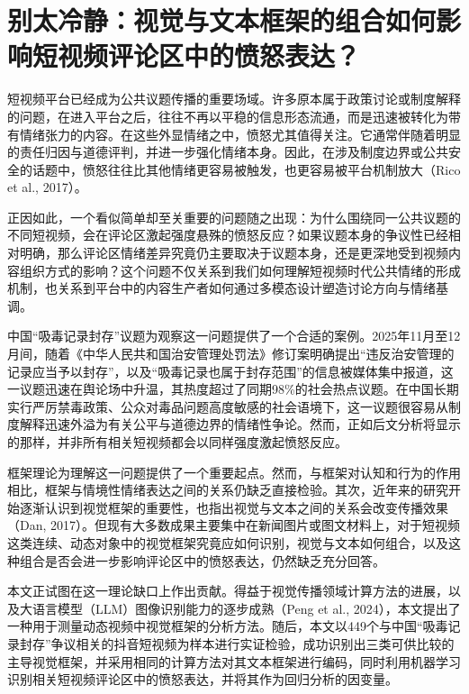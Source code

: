 \documentclass[
]{article}
\author{}
\date{}
\begin{document}
\section{别太冷静：视觉与文本框架的组合如何影响短视频评论区中的愤怒表达？}\label{ux522bux592aux51b7ux9759ux89c6ux89c9ux4e0eux6587ux672cux6846ux67b6ux7684ux7ec4ux5408ux5982ux4f55ux5f71ux54cdux77edux89c6ux9891ux8bc4ux8bbaux533aux4e2dux7684ux6124ux6012ux8868ux8fbe}

短视频平台已经成为公共议题传播的重要场域。许多原本属于政策讨论或制度解释的问题，在进入平台之后，往往不再以平稳的信息形态流通，而是迅速被转化为带有情绪张力的内容。在这些外显情绪之中，愤怒尤其值得关注。它通常伴随着明显的责任归因与道德评判，并进一步强化情绪本身。因此，在涉及制度边界或公共安全的话题中，愤怒往往比其他情绪更容易被触发，也更容易被平台机制放大（Rico
et al., 2017）。

正因如此，一个看似简单却至关重要的问题随之出现：为什么围绕同一公共议题的不同短视频，会在评论区激起强度悬殊的愤怒反应？如果议题本身的争议性已经相对明确，那么评论区情绪差异究竟仍主要取决于议题本身，还是更深地受到视频内容组织方式的影响？这个问题不仅关系到我们如何理解短视频时代公共情绪的形成机制，也关系到平台中的内容生产者如何通过多模态设计塑造讨论方向与情绪基调。

中国``吸毒记录封存''议题为观察这一问题提供了一个合适的案例。2025年11月至12月间，随着《中华人民共和国治安管理处罚法》修订案明确提出``违反治安管理的记录应当予以封存''，以及``吸毒记录也属于封存范围''的信息被媒体集中报道，这一议题迅速在舆论场中升温，其热度超过了同期98\%的社会热点议题。在中国长期实行严厉禁毒政策、公众对毒品问题高度敏感的社会语境下，这一议题很容易从制度解释迅速外溢为有关公平与道德边界的情绪性争论。然而，正如后文分析将显示的那样，并非所有相关短视频都会以同样强度激起愤怒反应。

框架理论为理解这一问题提供了一个重要起点。然而，与框架对认知和行为的作用相比，框架与情境性情绪表达之间的关系仍缺乏直接检验。其次，近年来的研究开始逐渐认识到视觉框架的重要性，也指出视觉与文本之间的关系会改变传播效果（Dan,
2017）。但现有大多数成果主要集中在新闻图片或图文材料上，对于短视频这类连续、动态对象中的视觉框架究竟应如何识别，视觉与文本如何组合，以及这种组合是否会进一步影响评论区中的愤怒表达，仍然缺乏充分回答。

本文正试图在这一理论缺口上作出贡献。得益于视觉传播领域计算方法的进展，以及大语言模型（LLM）图像识别能力的逐步成熟（Peng
et al.,
2024），本文提出了一种用于测量动态视频中视觉框架的分析方法。随后，本文以449个与中国``吸毒记录封存''争议相关的抖音短视频为样本进行实证检验，成功识别出三类可供比较的主导视觉框架，并采用相同的计算方法对其文本框架进行编码，同时利用机器学习识别相关短视频评论区中的愤怒表达，并将其作为回归分析的因变量。
\end{document}
